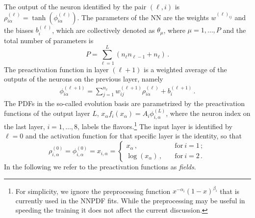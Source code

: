 The output of the neuron identified by the pair $(\ell,i)$ is
$\rho^{(\ell)}_{i\alpha} = \tanh\left(\phi^{(\ell)}_{i\alpha}\right)$.
The parameters of the NN are the weights $w^{(\ell)_{ij}}$ and the biases $b^{(\ell)}_i$, which are
collectively denoted as $\theta_\mu$, where $\mu = 1, \ldots, P$ and the total number of parameters
is
\begin{equation}
    \label{eq:TotPar}
    P = \sum_{\ell=1}^{L} \left(n_{\ell} n_{\ell-1} + n_\ell\right)\, .
\end{equation}
The preactivation function in layer $(\ell+1)$ is a weighted average of the outputs of the neurons on 
the previous layer, namely
\begin{align}
    \label{eq:RecursionNN}
    \phi^{(\ell+1)}_{i\alpha} = \sum_{j=1}^{n_\ell} w^{(\ell+1)}_{ij} \rho^{(\ell)}_{i\alpha} + b^{(\ell+1)}_{i}\, .
\end{align}
The PDFs in the
so-called evolution basis are parametrized by the preactivation functions of the output layer $L$,
$x_\alpha f_i(x_\alpha)=A_i \phi^{(L)}_{i,\alpha}$, where the neuron index on the last layer,
$i=1, \ldots, 8$, labels the 
flavors.\footnote{For simplicity, we ignore the preprocessing function $x^{-\alpha_i} (1-x)^{\beta_i}$ that
is currently used in the NNPDF fits. While the preprocessing may be useful in speeding the training
it does not affect the current discussion.}
The input layer is identified by $\ell=0$ and the activation
function for that specific layer is the identity, so that
\begin{equation}
    \label{eq:InitLayerPhi}
    \rho^{(0)}_{i,\alpha} = \phi^{(0)}_{i,\alpha} = x_{i,\alpha} =
    \begin{cases}
        x_\alpha\, , \quad &\text{for}\ i=1\, ;\\
        \log\left(x_\alpha\right)\, , \quad &\text{for}\ i=2\, .
    \end{cases}
\end{equation}
In the following we refer to the preactivation functions as {\em fields}.

